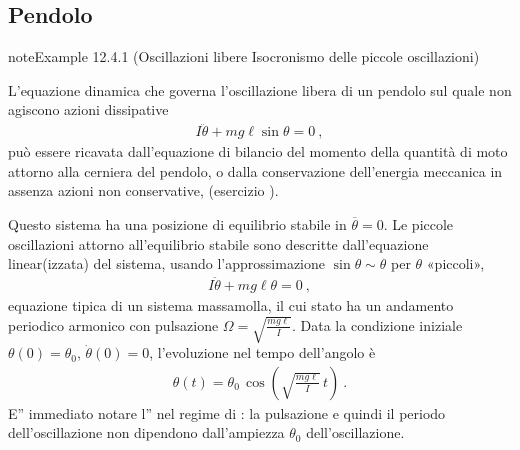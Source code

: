 \documentclass[letterpaper,10pt,italian]{jupyterBook}
\begin{document}
\subsection{Pendolo}
\label{\detokenize{ch/mechanics/dynamics-examples:pendolo}}\label{\detokenize{ch/mechanics/dynamics-examples:physics-hs-mechanics-dynamics-examples-pendulum}}\label{ch/mechanics/dynamics-examples:pendulum-free}
\begin{sphinxadmonition}{note}{Example 12.4.1 (Oscillazioni libere \sphinxhyphen{} Isocronismo delle piccole oscillazioni)}



\sphinxAtStartPar
L’equazione dinamica che governa l’oscillazione libera di un pendolo sul quale non agiscono azioni dissipative
\begin{equation*}
\begin{split}I \ddot{\theta} + m g \ell \sin \theta = 0 \ ,\end{split}
\end{equation*}
\sphinxAtStartPar
può essere ricavata dall’equazione di bilancio del momento della quantità di moto attorno alla cerniera del pendolo, o dalla conservazione dell’energia meccanica in assenza azioni non conservative, (esercizio ).

\sphinxAtStartPar
Questo sistema ha una posizione di equilibrio stabile in \(\overline{\theta} = 0\).
Le piccole oscillazioni attorno all’equilibrio stabile sono descritte dall’equazione linear(izzata) del sistema, usando l’approssimazione \(\sin \theta \sim \theta\) per \(\theta\) «piccoli»,
\begin{equation*}
\begin{split}I \ddot{\theta} + m g \ell \theta = 0 \ ,\end{split}
\end{equation*}
\sphinxAtStartPar
equazione tipica di un sistema massa\sphinxhyphen{}molla, il cui stato ha un andamento periodico armonico con pulsazione \(\Omega = \sqrt{\frac{m g \ell}{I}}\). Data la condizione iniziale \(\theta(0) = \theta_0\), \(\dot{\theta}(0) = 0\), l’evoluzione nel tempo dell’angolo è
\begin{equation*}
\begin{split}\theta(t) = \theta_0 \, \cos \left( \sqrt{\frac{m g \ell}{I}} \, t \right) \ .\end{split}
\end{equation*}
\sphinxAtStartPar
E” immediato notare l” nel regime di : la pulsazione e quindi il periodo dell’oscillazione non dipendono dall’ampiezza \(\theta_0\) dell’oscillazione.
\end{sphinxadmonition}
\end{document}
